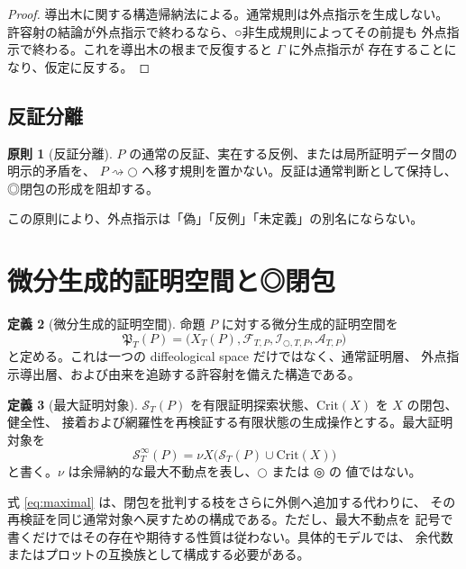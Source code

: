 \documentclass[a4paper,11pt]{ltjsarticle}
\theoremstyle{definition}
\newtheorem{definition}{定義}[section]
\newtheorem{principle}[definition]{原則}
\theoremstyle{plain}
\newcommand{\dfix}{\mathord{\text{○}}}
\newcommand{\udfix}{\mathord{\text{◎}}}
\newcommand{\Crit}{\mathrm{Crit}}
\newcommand{\1}{\mathbf{1}}
\begin{document}
\begin{proof}
導出木に関する構造帰納法による。通常規則は外点指示を生成しない。
許容射の結論が外点指示で終わるなら、○非生成規則によってその前提も
外点指示で終わる。これを導出木の根まで反復すると $\Gamma$ に外点指示が
存在することになり、仮定に反する。
\end{proof}

\subsection{反証分離}

\begin{principle}[反証分離]\label{pr:refutation}
$P$ の通常の反証、実在する反例、または局所証明データ間の明示的矛盾を、
$P\rightsquigarrow\dfix$ へ移す規則を置かない。反証は通常判断として保持し、
◎閉包の形成を阻却する。
\end{principle}

この原則により、外点指示は「偽」「反例」「未定義」の別名にならない。

\section{微分生成的証明空間と◎閉包}

\begin{definition}[微分生成的証明空間]
命題 $P$ に対する微分生成的証明空間を
\begin{equation}\label{eq:dps}
 \mathfrak P_T(P)=
 \bigl(X_T(P),\mathcal F_{T,P},
       \mathcal I_{\dfix,T,P},\mathcal A_{T,P}\bigr)
\end{equation}
と定める。これは一つの diffeological space だけではなく、通常証明層、
外点指示導出層、および由来を追跡する許容射を備えた構造である。
\end{definition}

\begin{definition}[最大証明対象]
$\mathcal S_T(P)$ を有限証明探索状態、$\Crit(X)$ を $X$ の閉包、健全性、
接着および網羅性を再検証する有限状態の生成操作とする。最大証明対象を
\begin{equation}\label{eq:maximal}
 \mathcal S_T^\infty(P)
 =\nu X\bigl(\mathcal S_T(P)\cup\Crit(X)\bigr)
\end{equation}
と書く。$\nu$ は余帰納的な最大不動点を表し、$\dfix$ または $\udfix$ の
値ではない。
\end{definition}

式 \eqref{eq:maximal} は、閉包を批判する枝をさらに外側へ追加する代わりに、
その再検証を同じ通常対象へ戻すための構成である。ただし、最大不動点を
記号で書くだけではその存在や期待する性質は従わない。具体的モデルでは、
余代数またはプロットの互換族として構成する必要がある。
\end{document}
